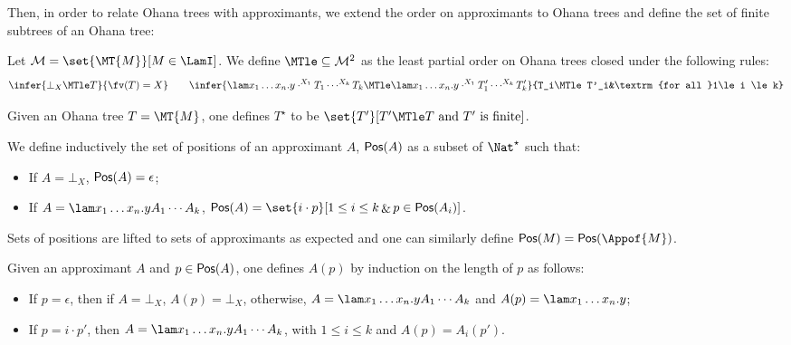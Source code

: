 Then, in order to relate Ohana trees with approximants, 
we extend the order on approximants to Ohana trees and define 
the set of finite subtrees of an Ohana tree:

\begin{definition} Let ${\cal M}=\set{\MT{M}}[M\in\LamI]$.
	We define $\mathord{\MTle}\subseteq {\cal M}^2$ as 
	the least partial order on Ohana trees closed under the following rules:
	\[
	\infer{\bot_X\MTle T}{\fv(T)=X}\qquad
	\infer{\lam x_1\ldots x_n.y\cdot^{X_1}T_1\cdots^{X_k}T_k
		\MTle \lam x_1\ldots x_n.y\cdot^{X_1}T'_1\cdots^{X_k}T'_k}
		{T_i\MTle T'_i&\textrm{for all }1\le i \le k}
	\]
\end{definition}


\begin{definition}
	Given an Ohana tree $T = \MT{M}$, one defines
	$T^\star$ to be $\set{T'}[T'\MTle T \text{ and $T'$ is finite}]$.
\end{definition}

\newcommand\pos[1]{{\sf Pos}(#1)}

\begin{definition}
	We define inductively the set of positions of an approximant $A$, 
	$\pos{A}$ as a subset of $\Nat^\star$ such that:
	\begin{itemize}
		\item If $A=\bot_X$, $\pos{A}=\epsilon$;
		\item If $A= \lam x_1\ldots x_n.yA_1\cdots A_k$, 
		$\pos{A}=\set{i\cdot p}[1\leq i \leq k \mathop{\&} p\in\pos{A_i}]$.
	\end{itemize}
	Sets of positions are lifted to sets of approximants as expected 
	and one can similarly define $\pos{M} = \pos{\Appof{M}}$. 
\end{definition}

\begin{definition}
	Given an approximant $A$ and $p\in \pos{A}$, one defines 
	$A(p)$ by induction on the length of $p$ as follows:
	\begin{itemize}
		\item If $p=\epsilon$, then if $A=\bot_X$, ${A}(p)=\bot_X$,
		otherwise, $A= \lam x_1\ldots x_n.yA_1\cdots A_k$ and 
		$A(p)=\lam x_1\ldots x_n.y$;
		\item If $p=i\cdot p'$, then $A= \lam x_1\ldots x_n.yA_1\cdots A_k$, 
		with $1\leq i \leq k$ and $A(p)=A_i(p')$.
	\end{itemize}
\end{definition}


